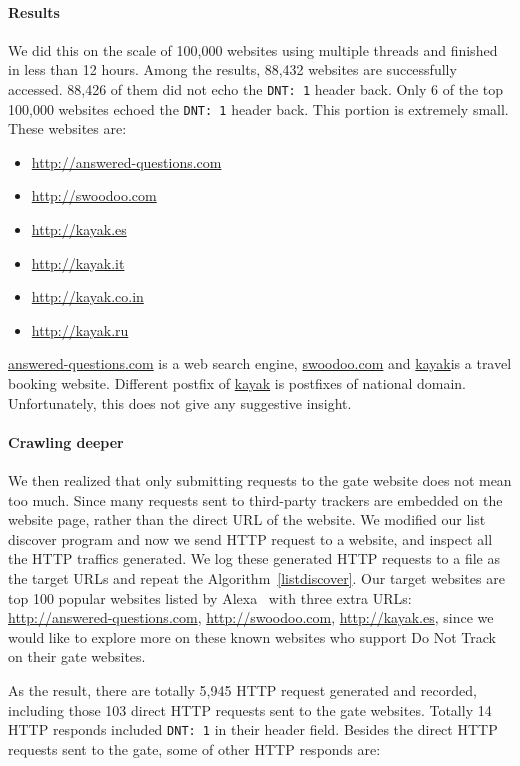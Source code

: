 \documentclass{sig-alternate}
\begin{document}
\paragraph{Results}
We did this on the scale of 100,000 websites using multiple threads and finished in less than 12 hours. Among the results, 88,432 websites are successfully accessed. 88,426 of them did not echo the \verb|DNT: 1| header back. Only 6 of the top 100,000 websites echoed the \verb|DNT: 1| header back. This portion is extremely small. These websites are:

\begin{itemize}
\item \url{http://answered-questions.com}
\item \url{http://swoodoo.com}
\item \url{http://kayak.es}
\item \url{http://kayak.it}
\item \url{http://kayak.co.in}
\item \url{http://kayak.ru}
\end{itemize}

\url{answered-questions.com} is a web search engine, \url{swoodoo.com} and \url{kayak}is a travel booking website. Different postfix of \url{kayak} is postfixes of national domain. Unfortunately, this does not give any suggestive insight. 

\paragraph{Crawling deeper}

We then realized that only submitting requests to the gate website does not mean too much. Since many requests sent to third-party trackers are embedded on the website page, rather than the direct URL of the website. We modified our list discover program and now we send HTTP request to a website, and inspect all the HTTP traffics generated. We log these generated HTTP requests to a file as the target URLs and repeat the Algorithm~\ref{listdiscover}. Our target websites are top 100 popular websites listed by Alexa~\cite{alexa} with three extra URLs: \url{http://answered-questions.com}, \url{http://swoodoo.com}, \url{http://kayak.es}, since we would like to explore more on these known websites who support Do Not Track on their gate websites.

As the result, there are totally 5,945 HTTP request generated and recorded, including those 103 direct HTTP requests sent to the gate websites. Totally 14 HTTP responds included \verb|DNT: 1| in their header field. Besides the direct HTTP requests sent to the gate, some of other HTTP responds are:
\end{document}
